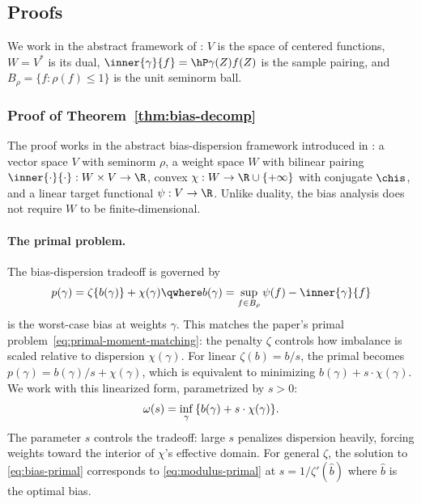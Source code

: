 \documentclass{article}
\begin{document}
\subsection{Proofs}
\label{sec:bias-proofs}

We work in the abstract framework
of :
$V$ is the space of centered functions,
$W = V^*$ is its dual,
$\inner{\gamma}{f} = \hP \gamma(Z) f(Z)$
is the sample pairing,
and $B_\rho = \{f : \rho(f) \le 1\}$
is the unit seminorm ball.

\subsubsection*{Proof of Theorem~\ref{thm:bias-decomp}}

The proof works in the abstract bias-dispersion framework introduced in : a vector space $V$ with seminorm $\rho$, a weight space $W$ with bilinear pairing $\inner{\cdot}{\cdot}: W \times V \to \R$, convex $\chi: W \to \R \cup \{+\infty\}$ with conjugate $\chis$, and a linear target functional $\psi: V \to \R$. Unlike duality, the bias analysis does not require $W$ to be finite-dimensional.

\paragraph{The primal problem.} The bias-dispersion tradeoff is governed by
\begin{equation}
\label{eq:bias-primal}
p(\gamma) = \zeta\{b(\gamma)\} + \chi(\gamma) \qwhere b(\gamma) = \sup_{f \in B_\rho} \psi(f) - \inner{\gamma}{f}
\end{equation}
is the worst-case bias at weights $\gamma$. This matches the paper's primal problem~\eqref{eq:primal-moment-matching}: the penalty $\zeta$ controls how imbalance is scaled relative to dispersion $\chi(\gamma)$. For linear $\zeta(b) = b/s$, the primal becomes $p(\gamma) = b(\gamma)/s + \chi(\gamma)$, which is equivalent to minimizing $b(\gamma) + s \cdot \chi(\gamma)$. We work with this linearized form, parametrized by $s > 0$:
\begin{equation}
\label{eq:modulus-primal}
\omega(s) = \inf_\gamma \qty{ b(\gamma) + s \cdot \chi(\gamma) }.
\end{equation}
The parameter $s$ controls the tradeoff: large $s$ penalizes dispersion heavily, forcing weights toward the interior of $\chi$'s effective domain. For general $\zeta$, the solution to \eqref{eq:bias-primal} corresponds to \eqref{eq:modulus-primal} at $s = 1/\zeta'(\hat b)$ where $\hat b$ is the optimal bias.
\end{document}
